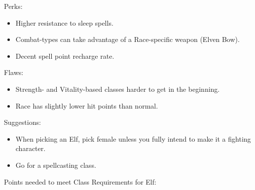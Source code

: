 \documentclass[12pt]{article}
\providecommand{\tightlist}{%
  \setlength{\itemsep}{0pt}\setlength{\parskip}{0pt}}
\newcommand{\indexRace}[1]{\index{#1}}
\newcommand{\race}[1]{#1\indexRace{#1}}
\newcommand{\WviiTwoColumnSetup}{\raggedcolumns\RaggedRight}
\begin{document}
\begin{multicols}{2}\WviiTwoColumnSetup
Perks:

\begin{itemize}
\tightlist
\item
  Higher resistance to sleep spells.
\item
  Combat-types can take advantage of a Race-specific weapon (Elven Bow).
\item
  Decent spell point recharge rate.
\end{itemize}
\columnbreak

Flaws:

\begin{itemize}
\tightlist
\item
  Strength- and Vitality-based classes harder to get in the beginning.
\item
  Race has slightly lower hit points than normal.
\end{itemize}
\end{multicols}

Suggestions:

\begin{itemize}
\item
  When picking an \race{Elf}, pick female unless you fully intend to make it a
  fighting character.
\item
  Go for a spellcasting class.
\end{itemize}

Points needed to meet Class Requirements for \race{Elf}:
\end{document}

